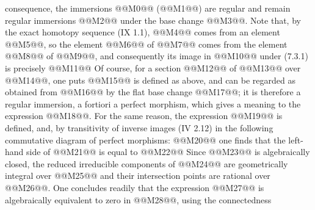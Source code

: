 consequence, the immersions @@M0@@ (@@M1@@) are regular and remain regular immersions @@M2@@ under the base change @@M3@@. Note that, by the exact homotopy sequence (IX 1.1), @@M4@@ comes from an element @@M5@@, so the element @@M6@@ of @@M7@@ comes from the element @@M8@@ of @@M9@@, and consequently its image in @@M10@@ under (7.3.1) is precisely
@@M11@@
Of course, for a section @@M12@@ of @@M13@@ over @@M14@@, one puts
@@M15@@
is defined as above, and can be regarded as obtained from @@M16@@ by the flat base change @@M17@@; it is therefore a regular immersion, a fortiori a perfect morphism, which gives a meaning to the expression @@M18@@. For the same reason, the expression @@M19@@ is defined, and, by transitivity of inverse images (IV 2.12) in the following commutative diagram of perfect morphisms:
@@M20@@
one finds that the left-hand side of @@M21@@ is equal to
@@M22@@
Since @@M23@@ is algebraically closed, the reduced irreducible components of @@M24@@ are geometrically integral over @@M25@@ and their intersection points are rational over @@M26@@. One concludes readily that the expression @@M27@@ is algebraically equivalent to zero in @@M28@@, using the connectedness

